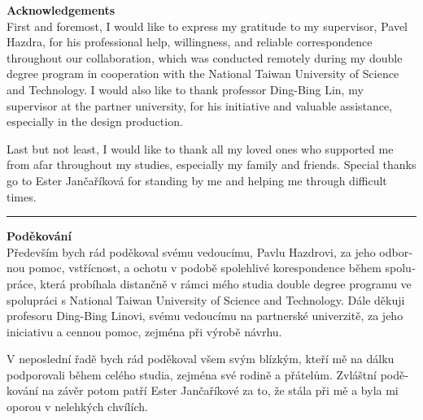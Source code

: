 \clearpage
\vspace*{\fill}
\noindent\textbf{Acknowledgements}\\[0.25cm]
First and foremost, I would like to express my gratitude to my supervisor, \foreignlanguage{czech}{Pavel Hazdra}, for his professional help, willingness, and reliable correspondence throughout our collaboration, which was conducted remotely during my double degree program in cooperation with the National Taiwan University of Science and Technology. I would also like to thank professor Ding-Bing Lin, my supervisor at the partner university, for his initiative and valuable assistance, especially in the design production.

Last but not least, I would like to thank all my loved ones who supported me from afar throughout my studies, especially my family and friends. Special thanks go to \foreignlanguage{czech}{Ester Jančaříková} for standing by me and helping me through difficult times.\\
\hrule\vspace*{1cm}
\begin{otherlanguage}{czech}
    \noindent\textbf{Poděkování}\\[0.25cm]
    Především bych rád poděkoval svému vedoucímu, Pavlu Hazdrovi, za jeho odbornou pomoc, vstřícnost, a ochotu v podobě spolehlivé korespondence během spolupráce, která probíhala distančně v rámci mého studia double degree programu ve spolupráci s National Taiwan University of Science and Technology. Dále děkuji profesoru Ding-Bing Linovi, svému vedoucímu na partnerské univerzitě, za jeho iniciativu a cennou pomoc, zejména při výrobě návrhu.
    
    V neposlední řadě bych rád poděkoval všem svým blízkým, kteří mě na dálku podporovali během celého studia, zejména své rodině a přátelům. Zvláštní poděkování na závěr potom patří Ester Jančaříkové za to, že stála při mě a byla mi oporou v nelehkých chvílích.
\end{otherlanguage}
\clearpage